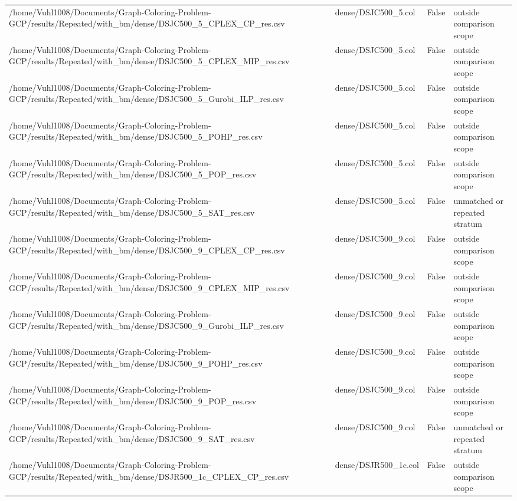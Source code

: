 \begin{table}[htbp]
\begin{tabular}{llll}
/home/Vuhl1008/Documents/Graph-Coloring-Problem-GCP/results/Repeated/with\_bm/dense/DSJC500\_5\_CPLEX\_CP\_res.csv & dense/DSJC500\_5.col & False & outside comparison scope \\
/home/Vuhl1008/Documents/Graph-Coloring-Problem-GCP/results/Repeated/with\_bm/dense/DSJC500\_5\_CPLEX\_MIP\_res.csv & dense/DSJC500\_5.col & False & outside comparison scope \\
/home/Vuhl1008/Documents/Graph-Coloring-Problem-GCP/results/Repeated/with\_bm/dense/DSJC500\_5\_Gurobi\_ILP\_res.csv & dense/DSJC500\_5.col & False & outside comparison scope \\
/home/Vuhl1008/Documents/Graph-Coloring-Problem-GCP/results/Repeated/with\_bm/dense/DSJC500\_5\_POHP\_res.csv & dense/DSJC500\_5.col & False & outside comparison scope \\
/home/Vuhl1008/Documents/Graph-Coloring-Problem-GCP/results/Repeated/with\_bm/dense/DSJC500\_5\_POP\_res.csv & dense/DSJC500\_5.col & False & outside comparison scope \\
/home/Vuhl1008/Documents/Graph-Coloring-Problem-GCP/results/Repeated/with\_bm/dense/DSJC500\_5\_SAT\_res.csv & dense/DSJC500\_5.col & False & unmatched or repeated stratum \\
/home/Vuhl1008/Documents/Graph-Coloring-Problem-GCP/results/Repeated/with\_bm/dense/DSJC500\_9\_CPLEX\_CP\_res.csv & dense/DSJC500\_9.col & False & outside comparison scope \\
/home/Vuhl1008/Documents/Graph-Coloring-Problem-GCP/results/Repeated/with\_bm/dense/DSJC500\_9\_CPLEX\_MIP\_res.csv & dense/DSJC500\_9.col & False & outside comparison scope \\
/home/Vuhl1008/Documents/Graph-Coloring-Problem-GCP/results/Repeated/with\_bm/dense/DSJC500\_9\_Gurobi\_ILP\_res.csv & dense/DSJC500\_9.col & False & outside comparison scope \\
/home/Vuhl1008/Documents/Graph-Coloring-Problem-GCP/results/Repeated/with\_bm/dense/DSJC500\_9\_POHP\_res.csv & dense/DSJC500\_9.col & False & outside comparison scope \\
/home/Vuhl1008/Documents/Graph-Coloring-Problem-GCP/results/Repeated/with\_bm/dense/DSJC500\_9\_POP\_res.csv & dense/DSJC500\_9.col & False & outside comparison scope \\
/home/Vuhl1008/Documents/Graph-Coloring-Problem-GCP/results/Repeated/with\_bm/dense/DSJC500\_9\_SAT\_res.csv & dense/DSJC500\_9.col & False & unmatched or repeated stratum \\
/home/Vuhl1008/Documents/Graph-Coloring-Problem-GCP/results/Repeated/with\_bm/dense/DSJR500\_1c\_CPLEX\_CP\_res.csv & dense/DSJR500\_1c.col & False & outside comparison scope \\

\end{tabular}
\end{table}
